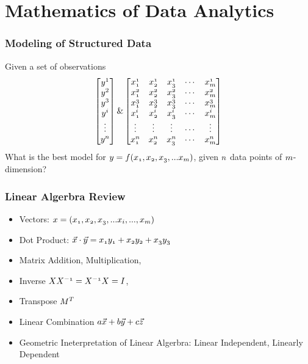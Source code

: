 \documentclass[notheorems, aspectratio=54]{beamer}
\begin{document}
\section{Mathematics of Data Analytics}

\begin{frame}
\frametitle{Modeling of Structured Data}
Given a set of observations
\[ \begin{bmatrix}  \mathnormal{y}^1 \\ \mathnormal{y}^2\\\mathnormal{y}^3\\\mathnormal{y}^i \\ \vdots \\\mathnormal{y}^n \end{bmatrix}
\&
\begin{bmatrix}
   \mathnormal{x^1_1} &\mathnormal{x^1_2}  &\mathnormal{x^1_3} & \cdots &\mathnormal{x^1_m}\\
   \mathnormal{x^2_1} &\mathnormal{x^2_2} &\mathnormal{x^2_3} & \cdots &\mathnormal{x^2_m}\\
   \mathnormal{x^3_1} &\mathnormal{x^3_2} &\mathnormal{x^3_3} & \cdots &\mathnormal{x^3_m}\\
   \mathnormal{x^i_1} &\mathnormal{x^i_2} &\mathnormal{x^i_3} & \cdots &\mathnormal{x^i_m}\\
   \vdots &\vdots &\vdots & \cdots &\vdots\\
   \mathnormal{x^n_1} &\mathnormal{x^n_2} &\mathnormal{x^n_3} &\cdots &\mathnormal{x^n_m}
  \end{bmatrix}
\]
What is the best model for $\mathnormal{y}=\mathnormal{f(x_1, x_2, x_3,  ... x_m)}$, given $\mathnormal{n}$ data points of $\mathnormal{m}$-dimension?
\end{frame}


\begin{frame}
\frametitle{Linear Algerbra Review}
\begin{itemize}
\item Vectors: $\mathnormal{x=(x_1, x_2, x_3,...x_i, ..., x_m)}$
\item Dot Product: $\mathnormal{\vec{x}\cdot\vec{y}=x_1 y_1+x_2 y_2+x_3 y_3}$
\item Matrix Addition, Multiplication, 
\item Inverse $\mathnormal{{X}X^{-1}=X^{-1}X=I}$, 
\item Transpose $\mathnormal{M^{T}}$
\item Linear Combination $\mathnormal{a\vec{x}+b\vec{y}+c\vec{z}}$
\item Geometric Ineterpretation of Linear Algerbra: Linear Independent, Linearly Dependent
\end{itemize}
\end{frame}
\end{document}
